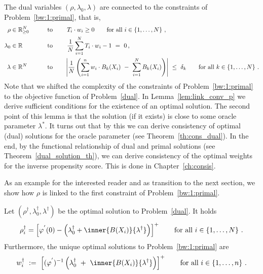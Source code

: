 \begin{remark}
  The dual variables $(\rho,\lambda_0,\lambda)$ are connected to the constraints of Problem~\ref{bw:1:primal}, that is,
  \begin{align*}
    \rho&\in\R^N_{\ge 0}
  &&
  \qquad
  \text{to}
  \qquad
  \ 
  T_i\cdot w_i\ge 0
  \qquad
  \text{for all}\ i\in \left\{ 1,\ldots,N \right\}
  \,,
  \\
    \lambda_0&\in\R
  &&
  \qquad
  \text{to}\qquad
  \ 
  \frac{1}{N}
  \sum_{i=1}^{N} 
  T_i\cdot w_i
  -
  1
  \ 
  =
  \ 
  0
  \,,
  \\
    \lambda&\in\R^N 
  &&
  \qquad
  \text{to}\qquad
    \left| 
      \frac{1}{N} 
      \left( 
      \sum_{i = 1}^{n} 
      w_i
      \cdot
      B_k(X_i)
      \ 
      -
      \ 
      \sum_{i=1}^{N} 
      B_k(X_i)
      \right)
    \right|
    \ 
    \le 
    \ 
    \delta_k
    \qquad
    \text{for all}\ 
    k \in \left\{ 1, \ldots, N \right\}
    \,.
  \end{align*}
  Note that we shifted the complexity of the constraints of Problem~\ref{bw:1:primal} to the objective function of Problem~\ref{dual}. In Lemma~\ref{lem:link_conv_p} we derive sufficient conditions for the existence of an optimal solution. The second point of this lemma is that the solution (if it exists) is close to some oracle parameter $\lambda^*$. It turns out that by this we can derive consistency of optimal (dual) solutions for the oracle parameter (see Theorem~\ref{th:cons_dual}). In the end, by the functional relationship of dual and primal solutions (see Theorem~\ref{dual_solution_th}), we can derive consistency of the optimal weights for the inverse propensity score. This is done in Chapter~\ref{ch:consis}.
\end{remark}
As an example for the interested reader and as transition to the next section, we show how $\rho$ is linked to the first constraint of Problem~\ref{bw:1:primal}. 
\begin{lemma}
  \label{lem:simple_weights}
  Let 
$
(\rho^\dagger,\lambda_0^\dagger,\lambda^\dagger)
$
be the optimal solution to Problem~\ref{dual}.
It holds
\begin{align*}
  \rho_i^\dagger
  =
  \left[ 
  \varphi^{'}
  (0)
  -
  \left( 
    \lambda_0^\dagger + \inner{B(X_i)}{\lambda^\dagger}
  \right)
  \right]^+
\qquad
  \text{for all}\ i\in \left\{ 1,\ldots,N \right\}
  \,.
\end{align*}
Furthermore, the unique optimal solutions to Problem~\ref{bw:1:primal} are
\begin{align*}
  w^\dagger_i
  \ 
  :=
  \ 
  \left[
  (
  \varphi^{'}
  )^{-1}
  \left(
\lambda_0^\dagger
  \ 
+
  \ 
\inner
{B(X_i)}
{
\lambda^{\dagger}
}
  \right)
  \right]^+
  \qquad
  \text{for all}\ 
  i\in
  \left\{ 1,\ldots,n \right\}
  \,.
\end{align*}
\end{lemma}
